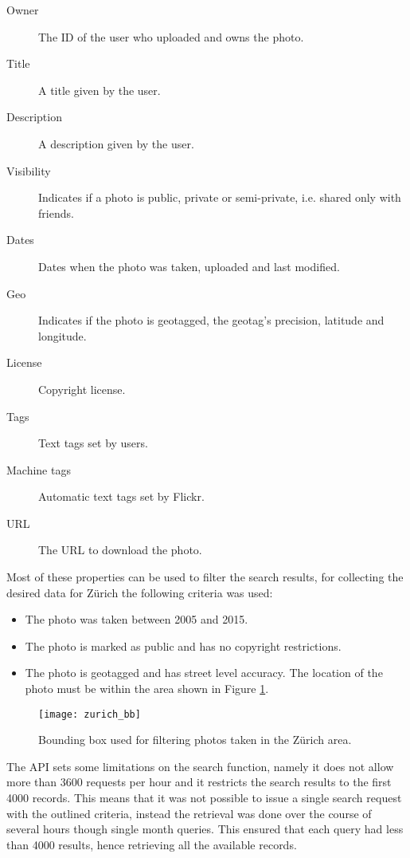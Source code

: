 \begin{description}
  \item[Owner] The ID of the user who uploaded and owns the photo.
  \item[Title] A title given by the user.
  \item[Description] A description given by the user.
  \item[Visibility] Indicates if a photo is public, private or semi-private, i.e. shared only with friends.
  \item[Dates] Dates when the photo was taken, uploaded and last modified.
  \item[Geo] Indicates if the photo is geotagged, the geotag's precision, latitude and longitude.
  \item[License] Copyright license.
  \item[Tags] Text tags set by users.
  \item[Machine tags] Automatic text tags set by Flickr.
  \item[URL] The URL to download the photo. 
\end{description}

Most of these properties can be used to filter the search results, for collecting the desired data for Zürich the following criteria was used:

\begin{itemize}
  \item The photo was taken between 2005 and 2015.
  \item The photo is marked as public and has no copyright restrictions.
  \item The photo is geotagged and has street level accuracy. The location of the photo must be within the area shown in Figure \ref{fig:zurich_bb}.
\end{itemize}

\begin{figure}
  \centering
  \texttt{[image: zurich\_bb]}
  \caption{Bounding box used for filtering photos taken in the Zürich area.}
  \label{fig:zurich_bb}
\end{figure}

The API sets some limitations on the search function, namely it does not allow more than 3600 requests per hour and it restricts the search results to the first 4000 records. This means that it was not possible to issue a single search request with the outlined criteria, instead the retrieval was done over the course of several hours though single month queries. This ensured that each query had less than 4000 results, hence retrieving all the available records.

